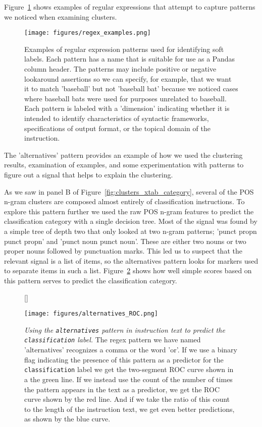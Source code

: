 Figure~\ref{fig:regex_examples} shows examples of regular expressions that attempt to capture patterns we noticed when examining clusters.

\begin{figure}
  \centering
  \texttt{[image: figures/regex\_examples.png]}
  \caption{
  Examples of regular expression patterns used for identifying soft labels. Each pattern has a name that is suitable for use as a Pandas column header. The patterns may include positive or negative lookaround assertions so we can specify, for example, that we want it to match 'baseball' but not 'baseball bat' because we noticed cases where baseball bats were used for purposes unrelated to baseball. Each pattern is labeled with a 'dimension' indicating whether it is intended to identify characteristics of syntactic frameworks, specifications of output format, or the topical domain of the instruction.
  }
  \label{fig:regex_examples}
\end{figure}

The 'alternatives' pattern provides an example of how we used the clustering results, examination of examples, and some experimentation with patterns to figure out a signal that helps to explain the clustering.

As we saw in panel B of Figure~\ref{fig:clusters_xtab_category}, several of the POS n-gram clusters are composed almost entirely of classification instructions. To explore this pattern further we used the raw POS n-gram features to predict the classification category with a single decision tree. Most of the signal was found by a simple tree of depth two that only looked at two n-gram patterns; 'punct propn punct propn' and 'punct noun punct noun'. These are either two nouns or two proper nouns followed by punctuation marks. This led us to suspect that the relevant signal is a list of items, so the alternatives pattern looks for markers used to separate items in such a list. Figure~\ref{fig:alternatives_ROC} shows how well simple scores based on this pattern serves to predict the classification category.

\begin{figure}
  \centering
  [\FBwidth]
  {  
      \caption{  
       \emph{Using the \texttt{alternatives} pattern in instruction text to predict the \texttt{classification} label.} The regex pattern we have named 'alternatives' recognizes a comma or the word 'or'. If we use a binary flag indicating the presence of this pattern as a predictor for the \texttt{classification} label we get the two-segment ROC curve shown in a the green line. If we instead use the count of the number of times the pattern appears in the text as a predictor, we get the ROC curve shown by the red line. And if we take the ratio of this count to the length of the instruction text, we get even better predictions, as shown by the blue curve.
      }
  }
  {
     \texttt{[image: figures/alternatives\_ROC.png]}
     \label{fig:alternatives_ROC}
  }
\end{figure}

